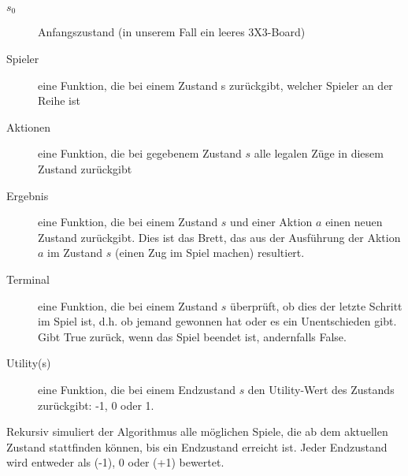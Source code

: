 \begin{description}
 \item [$s_0$] Anfangszustand (in unserem Fall ein leeres 3X3-Board)
 \item [Spieler] eine Funktion, die bei einem Zustand s zurückgibt, welcher Spieler an der Reihe ist
 \item [Aktionen] eine Funktion, die bei gegebenem Zustand $s$ alle legalen Züge in diesem Zustand zurückgibt
 \item [Ergebnis] eine Funktion, die bei einem Zustand $s$ und einer Aktion $a$ einen neuen Zustand zurückgibt. Dies ist das Brett, das aus der Ausführung der Aktion $a$ im Zustand $s$ (einen Zug im Spiel machen) resultiert.
 \item[Terminal] eine Funktion, die bei einem Zustand $s$ überprüft, ob dies der letzte Schritt im Spiel ist, d.h. ob jemand gewonnen hat oder es ein Unentschieden gibt. Gibt True zurück, wenn das Spiel beendet ist, andernfalls False.
 \item[Utility(s)] eine Funktion, die bei einem Endzustand $s$ den Utility-Wert des Zustands zurückgibt: -1, 0 oder 1.
\end{description}



Rekursiv simuliert der Algorithmus alle möglichen Spiele, die ab dem aktuellen Zustand stattfinden können, bis ein Endzustand erreicht ist. Jeder Endzustand wird entweder als (-1), 0 oder (+1) bewertet.
